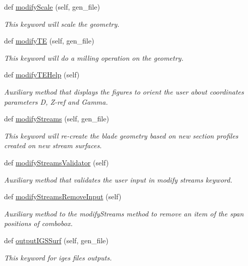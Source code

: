 \begin{DoxyCompactItemize}
def \hyperlink{a00073_aa1bef88b3d57a567e44548155e7ec02f}{modify\+Scale} (self, gen\+\_\+file)
\begin{DoxyCompactList}\small\item\em This keyword will scale the geometry. \end{DoxyCompactList}\item 
def \hyperlink{a00073_a52d4edd27f78b5559e6e3683c6adb3bc}{modify\+TE} (self, gen\+\_\+file)
\begin{DoxyCompactList}\small\item\em This keyword will do a milling operation on the geometry. \end{DoxyCompactList}\item 
def \hyperlink{a00073_a0894116159595156b62859c796bdea1d}{modify\+T\+E\+Help} (self)
\begin{DoxyCompactList}\small\item\em Auxiliary method that displays the figures to orient the user about coordinates parameters D, Z-\/ref and Gamma. \end{DoxyCompactList}\item 
def \hyperlink{a00073_a66f6209a0c4caa0ba5e25b5fd913eff5}{modify\+Streams} (self, gen\+\_\+file)
\begin{DoxyCompactList}\small\item\em This keyword will re-\/create the blade geometry based on new section profiles created on new stream surfaces. \end{DoxyCompactList}\item 
def \hyperlink{a00073_af60dda179dc289691a59b52cb8ed3e70}{modify\+Streams\+Validator} (self)
\begin{DoxyCompactList}\small\item\em Auxiliary method that validates the user input in modify streams keyword. \end{DoxyCompactList}\item 
def \hyperlink{a00073_ade4195a752861e46586e7b163136620f}{modify\+Streams\+Remove\+Input} (self)
\begin{DoxyCompactList}\small\item\em Auxiliary method to the modify\+Streams method to remove an item of the span positions of combobox. \end{DoxyCompactList}\item 
def \hyperlink{a00073_ada62706610465b6ba0d6fe5070cdbb9c}{output\+I\+G\+S\+Surf} (self, gen\+\_\+file)
\begin{DoxyCompactList}\small\item\em This keyword for iges files outputs. \end{DoxyCompactList}\item 

\end{DoxyCompactItemize}
